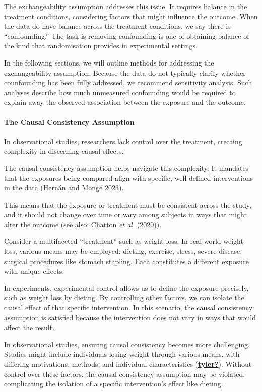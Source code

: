 \documentclass[
  singlecolumn]{article}
\let\oldparagraph\paragraph
\renewcommand{\paragraph}[1]{\oldparagraph{#1}\mbox{}}
\begin{document}
The exchangeability assumption addresses this issue. It requires balance
in the treatment conditions, considering factors that might influence
the outcome. When the data do have balance across the treatment
conditions, we say there is ``confounding.'' The task is removing
confounding is one of obtaining balance of the kind that randomisation
provides in experimental settings.

In the following sections, we will outline methods for addressing the
exchangeability assumption. Because the data do not typically clarify
whether counfounding has been fully addressed, we recommend sensitivity
analysis. Such analyses describe how much unmeasured confounding would
be required to explain away the observed association between the
exposure and the outcome.

\paragraph{\texorpdfstring{\textbf{The Causal Consistency
Assumption}}{The Causal Consistency Assumption}}\label{the-causal-consistency-assumption}

In observational studies, researchers lack control over the treatment,
creating complexity in discerning causal effects.

The causal consistency assumption helps navigate this complexity. It
mandates that the exposures being compared align with specific,
well-defined interventions in the data
(\hyperref[ref-hernuxe1n2023]{Hernán and Monge 2023}).

This means that the exposure or treatment must be consistent across the
study, and it should not change over time or vary among subjects in ways
that might alter the outcome (see also: Chatton \emph{et al.}
(\hyperref[ref-chatton2020]{2020})).

Consider a multifaceted ``treatment'' such as weight loss. In real-world
weight loss, various means may be employed: dieting, exercise, stress,
severe disease, surgical procedures like stomach stapling. Each
constitutes a different exposure with unique effects.

In experiments, experimental control allows us to define the exposure
precisely, such as weight loss by dieting. By controlling other factors,
we can isolate the causal effect of that specific intervention. In this
scenario, the causal consistency assumption is satisfied because the
intervention does not vary in ways that would affect the result.

In observational studies, ensuring causal consistency becomes more
challenging. Studies might include individuals losing weight through
various means, with differing motivations, methods, and individual
characteristics (\hyperref[ref-tyler]{\textbf{tyler?}}). Without control
over these factors, the causal consistency assumption may be violated,
complicating the isolation of a specific intervention's effect like
dieting.
\end{document}
